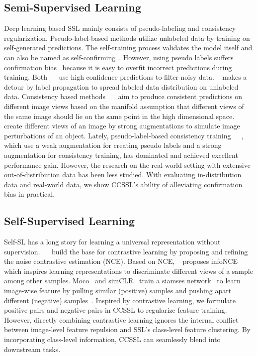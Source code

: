 \documentclass[10pt,twocolumn,letterpaper]{article}
\begin{document}
\subsection{Semi-Supervised Learning}
Deep learning based SSL mainly consists of pseudo-labeling and consistency regularization. Pseudo-label-based methods utilize unlabeled data by training on self-generated predictions. The self-training process validates the model itself and can also be named as self-confirming~\cite{dictionary2002merriam}. However, using pseudo labels suffers confirmation bias~\cite{arazo2020pseudo} because it is easy to overfit incorrect predictions during training. Both ~\cite{sohn2020fixmatch}~\cite{berthelot2019mixmatch} use high confidence predictions to filter noisy data. ~\cite{iscen2019label} makes a detour by label propagation to spread labeled data distribution on unlabeled data. Consistency based methods~\cite{jeong2019consistency}~\cite{tang2021humble}~\cite{sohn2020fixmatch} aim to produce consistent predictions on different image views based on the manifold assumption that different views of the same image should lie on the same point in the high dimensional space. ~\cite{sohn2020fixmatch}~\cite{tarvainen2017mean} create different views of an image by strong augmentations to simulate image perturbations of an object. Lately, pseudo-label-based consistency training~\cite{sohn2020fixmatch}~\cite{berthelot2019mixmatch}~\cite{berthelot2019remixmatch}, which use a weak augmentation for creating pseudo labels and a strong augmentation for consistency training, has dominated and achieved excellent performance gain. However, the research on the real-world setting with extensive out-of-distribution data has been less studied. With evaluating in-distribution data and real-world data, we show CCSSL's ability of alleviating confirmation bias in practical.  

\subsection{Self-Supervised Learning}
Self-SL has a long story for learning a universal representation without supervision. ~\cite{hinton2002training}~\cite{hyvarinen2005estimation} build the base for contrastive learning by proposing and refining the noise contrastive estimation (NCE). Based on NCE, ~\cite{oord2018representation} proposes infoNCE which inspires learning representations to discriminate different views of a sample among other samples. Moco~\cite{he2020momentum} and simCLR~\cite{chen2020simple} train a siamses network~\cite{chen2021exploring} to learn image-wise feature by pulling similar (positive) samples and pushing apart different (negative) samples~\cite{chen2021empirical}. Inspired by contrastive learning, we formulate positive pairs and negative pairs in CCSSL to regularize feature training. However, directly combining contrastive learning ignores the internal conflict between image-level feature repulsion and SSL's class-level feature clustering. By incorporating class-level information, CCSSL can seamlessly blend into downstream tasks.  
\end{document}
